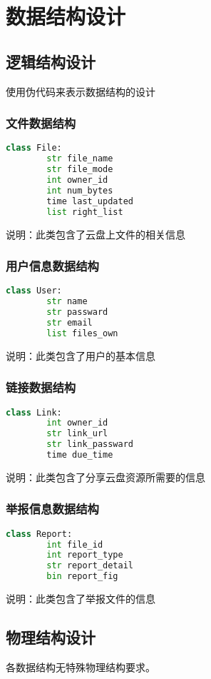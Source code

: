 \chapter{数据结构设计}

\section{逻辑结构设计}
使用伪代码来表示数据结构的设计
\subsection{文件数据结构}
\begin{lstlisting}[language=Python]
    class File:
        str file_name
        str file_mode
        int owner_id
        int num_bytes
        time last_updated
        list right_list
\end{lstlisting}
说明：此类包含了云盘上文件的相关信息
\subsection{用户信息数据结构}
\begin{lstlisting}[language=Python]
    class User:
        str name
        str passward
        str email
        list files_own
\end{lstlisting}
说明：此类包含了用户的基本信息
\subsection{链接数据结构}
\begin{lstlisting}[language=Python]
    class Link:
        int owner_id
        str link_url
        str link_passward
        time due_time
\end{lstlisting}
说明：此类包含了分享云盘资源所需要的信息

\subsection{举报信息数据结构}
\begin{lstlisting}[language=Python]
    class Report:
        int file_id
        int report_type
        str report_detail
        bin report_fig
\end{lstlisting}
说明：此类包含了举报文件的信息
        
\section{物理结构设计}
各数据结构无特殊物理结构要求。

